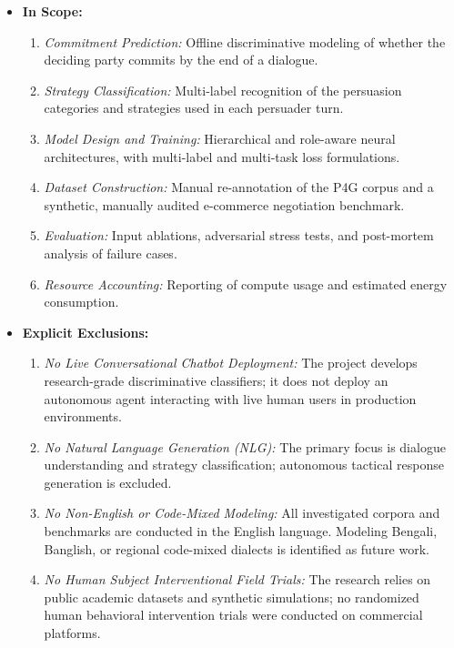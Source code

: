 \begin{keypoint}
\begin{itemize}
  \item \textbf{In Scope:}
    \begin{enumerate}
      \item \textit{Commitment Prediction:} Offline discriminative modeling of whether the deciding party commits by the end of a dialogue.
      \item \textit{Strategy Classification:} Multi-label recognition of the persuasion categories and strategies used in each persuader turn.
      \item \textit{Model Design and Training:} Hierarchical and role-aware neural architectures, with multi-label and multi-task loss formulations.
      \item \textit{Dataset Construction:} Manual re-annotation of the P4G corpus and a synthetic, manually audited e-commerce negotiation benchmark.
      \item \textit{Evaluation:} Input ablations, adversarial stress tests, and post-mortem analysis of failure cases.
      \item \textit{Resource Accounting:} Reporting of compute usage and estimated energy consumption.
    \end{enumerate}
  \item \textbf{Explicit Exclusions:}
    \begin{enumerate}
      \item \textit{No Live Conversational Chatbot Deployment:} The project develops research-grade discriminative classifiers; it does not deploy an autonomous agent interacting with live human users in production environments.
      \item \textit{No Natural Language Generation (NLG):} The primary focus is dialogue understanding and strategy classification; autonomous tactical response generation is excluded.
      \item \textit{No Non-English or Code-Mixed Modeling:} All investigated corpora and benchmarks are conducted in the English language. Modeling Bengali, Banglish, or regional code-mixed dialects is identified as future work.
      \item \textit{No Human Subject Interventional Field Trials:} The research relies on public academic datasets and synthetic simulations; no randomized human behavioral intervention trials were conducted on commercial platforms.
    \end{enumerate}
\end{itemize}
\end{keypoint}
